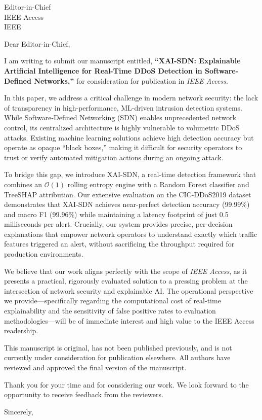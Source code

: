 \documentclass[11pt,a4paper]{letter}
\begin{document}
\begin{letter}{Editor-in-Chief \\ IEEE Access \\ IEEE}
\opening{Dear Editor-in-Chief,}

I am writing to submit our manuscript entitled, \textbf{``XAI-SDN: Explainable Artificial Intelligence for Real-Time DDoS Detection in Software-Defined Networks,''} for consideration for publication in \textit{IEEE Access}. 

In this paper, we address a critical challenge in modern network security: the lack of transparency in high-performance, ML-driven intrusion detection systems. While Software-Defined Networking (SDN) enables unprecedented network control, its centralized architecture is highly vulnerable to volumetric DDoS attacks. Existing machine learning solutions achieve high detection accuracy but operate as opaque ``black boxes,'' making it difficult for security operators to trust or verify automated mitigation actions during an ongoing attack.

To bridge this gap, we introduce XAI-SDN, a real-time detection framework that combines an $\mathcal{O}(1)$ rolling entropy engine with a Random Forest classifier and TreeSHAP attribution. Our extensive evaluation on the CIC-DDoS2019 dataset demonstrates that XAI-SDN achieves near-perfect detection accuracy (99.99\%) and macro F1 (99.96\%) while maintaining a latency footprint of just 0.5 milliseconds per alert. Crucially, our system provides precise, per-decision explanations that empower network operators to understand exactly which traffic features triggered an alert, without sacrificing the throughput required for production environments.

We believe that our work aligns perfectly with the scope of \textit{IEEE Access}, as it presents a practical, rigorously evaluated solution to a pressing problem at the intersection of network security and explainable AI. The operational perspective we provide---specifically regarding the computational cost of real-time explainability and the sensitivity of false positive rates to evaluation methodologies---will be of immediate interest and high value to the IEEE Access readership.

This manuscript is original, has not been published previously, and is not currently under consideration for publication elsewhere. All authors have reviewed and approved the final version of the manuscript.

Thank you for your time and for considering our work. We look forward to the opportunity to receive feedback from the reviewers.

\closing{Sincerely,}
\end{letter}
\end{document}
